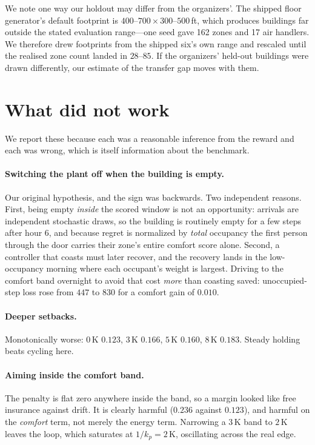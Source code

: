 \documentclass[10pt]{article}
\begin{document}
We note one way our holdout may differ from the organizers'. The shipped floor
generator's default footprint is $400$--$700 \times 300$--$500$\,ft, which
produces buildings far outside the stated evaluation range---one seed gave 162
zones and 17 air handlers. We therefore drew footprints from the shipped six's
own range and rescaled until the realised zone count landed in $28$--$85$. If
the organizers' held-out buildings were drawn differently, our estimate of the
transfer gap moves with them.

\section{What did not work}
\label{sec:negative}

We report these because each was a reasonable inference from the reward and each
was wrong, which is itself information about the benchmark.

\paragraph{Switching the plant off when the building is empty.} Our original
hypothesis, and the sign was backwards. Two independent reasons. First, being
empty \emph{inside} the scored window is not an opportunity: arrivals are
independent stochastic draws, so the building is routinely empty for a few steps
after hour 6, and because regret is normalized by \emph{total} occupancy the
first person through the door carries their zone's entire comfort score alone.
Second, a controller that coasts must later recover, and the recovery lands in
the low-occupancy morning where each occupant's weight is largest. Driving to
the comfort band overnight to avoid that cost \emph{more} than coasting saved:
unoccupied-step loss rose from $447$ to $830$ for a comfort gain of $0.010$.

\paragraph{Deeper setbacks.} Monotonically worse: $0$\,K $0.123$, $3$\,K
$0.166$, $5$\,K $0.160$, $8$\,K $0.183$. Steady holding beats cycling here.

\paragraph{Aiming inside the comfort band.} The penalty is flat zero anywhere
inside the band, so a margin looked like free insurance against drift. It is
clearly harmful ($0.236$ against $0.123$), and harmful on the \emph{comfort}
term, not merely the energy term. Narrowing a $3$\,K band to $2$\,K leaves the
loop, which saturates at $1/k_p = 2$\,K, oscillating across the real edge.
\end{document}
